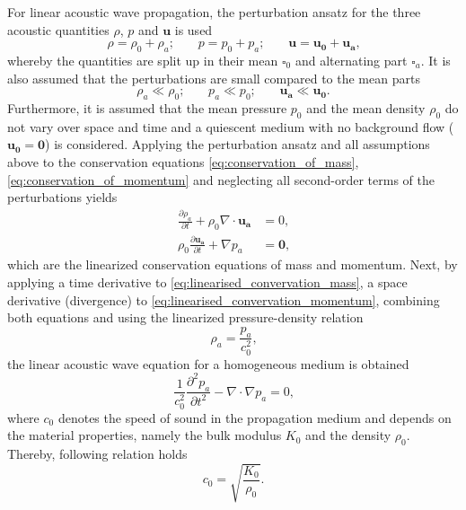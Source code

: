 For linear acoustic wave propagation, the perturbation ansatz for the three acoustic quantities $\rho$, $p$ and $\boldsymbol{u}$ is used
\begin{equation}
	\rho = \rho_0 + \rho_a\text{;}\qquad p = p_0 + p_a\text{;}\qquad \boldsymbol{u} = \boldsymbol{u_0} + \boldsymbol{u_a}\text{,}
\end{equation}
whereby the quantities are split up in their mean $\square_0$ and alternating part $\square_a$. It is also assumed that the perturbations are small compared to the mean parts
\begin{equation}
	\rho_a \ll \rho_0\text{;}\qquad p_a \ll p_0\text{;}\qquad \boldsymbol{u_a} \ll \boldsymbol{u_0}\text{.}
\end{equation}
Furthermore, it is assumed that the mean pressure $p_0$ and the mean density $\rho_0$ do not vary over space and time and a quiescent medium with no background flow ($\boldsymbol{u_0} = \boldsymbol{0}$) is considered. Applying the perturbation ansatz and all assumptions above to the conservation equations \cref{eq:conservation_of_mass}, \cref{eq:conservation_of_momentum} and neglecting all second-order terms of the perturbations yields
\begin{align}
	\frac{\partial \rho_a}{\partial t} + \rho_0\nabla\cdot\boldsymbol{u_a} &= 0\text{,} \label{eq:linearised_convervation_mass} \\ 
	\rho_0\frac{\partial \boldsymbol{u_a}}{\partial t} + \nabla p_a &= \boldsymbol{0}\text{,} \label{eq:linearised_convervation_momentum}
\end{align}
which are the linearized conservation equations of mass and momentum. Next, by applying a time derivative to \cref{eq:linearised_convervation_mass}, a space derivative (divergence) to \cref{eq:linearised_convervation_momentum}, combining both equations and using the linearized pressure-density relation
\begin{equation}
	\rho_a = \frac{p_a}{c_0^2}\text{,}
\end{equation}
the linear acoustic wave equation for a homogeneous medium is obtained
\begin{equation}
	\frac{1}{c_0^2}\frac{\partial^2 p_a}{\partial t^2} - \nabla\cdot\nabla p_a = 0\text{,} \label{eq:wave_equation}
\end{equation}
where $c_0$ denotes the speed of sound in the propagation medium and depends on the material properties, namely the bulk modulus $K_0$ and the density $\rho_0$. Thereby, following relation holds \cite{fahy_foundations_2001, kinsler_fundamentals_2000}
\begin{equation}
	c_0 = \sqrt{\frac{K_0}{\rho_0}}\text{.}
\end{equation}

